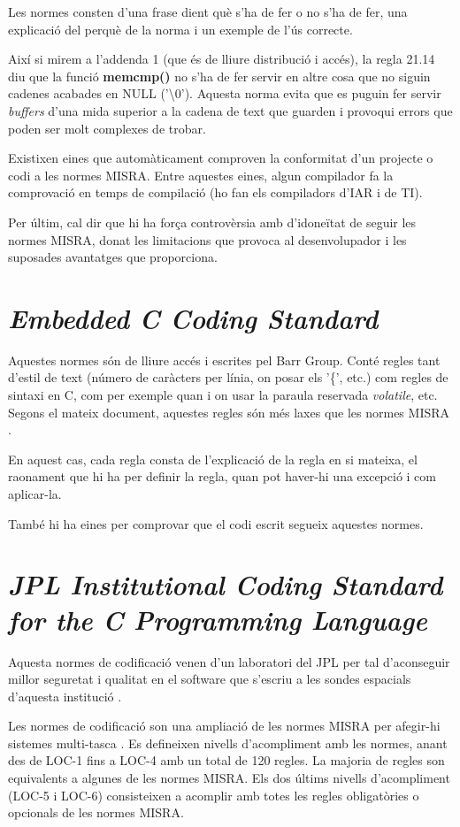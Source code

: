 Les normes consten d'una frase dient què s'ha de fer o no s'ha de fer, una explicació del perquè de la norma i un exemple de l'ús correcte.

Així si mirem a l'addenda 1 \cite[4]{MISRAAmend} (que és de lliure distribució i accés), la regla 21.14 diu que la funció {\bf memcmp()} no s'ha de fer servir en altre cosa que no siguin cadenes acabades en NULL ('\textbackslash 0'). Aquesta norma evita que es puguin fer servir {\em buffers} d'una mida superior a la cadena de text que guarden i provoqui errors que poden ser molt complexes de trobar.

Existixen eines que automàticament comproven la conformitat d'un projecte o codi a les normes MISRA. Entre aquestes eines, algun compilador fa la comprovació en temps de compilació (ho fan els compiladors d'IAR i de TI).

Per últim, cal dir que hi ha força controvèrsia amb d'idoneïtat de seguir les normes MISRA, donat les limitacions que provoca al desenvolupador i les suposades avantatges que proporciona.

\section{\em Embedded C Coding Standard}
Aquestes normes són de lliure accés i escrites pel Barr Group. Conté regles tant d'estil de text (número de caràcters per línia, on posar els '\{', etc.) com regles de sintaxi en C, com per exemple quan i on usar la paraula reservada {\em volatile}, etc. Segons el mateix document, aquestes regles són més laxes que les normes MISRA \cite{BARRGuidelines}.

En aquest cas, cada regla consta de l'explicació de la regla en si mateixa, el raonament que hi ha per definir la regla, quan pot haver-hi una excepció i com aplicar-la.

També hi ha eines per comprovar que el codi escrit segueix aquestes normes.

\section{\em JPL Institutional Coding Standard for the C Programming Language}
Aquesta normes de codificació venen d'un laboratori del JPL per tal d'aconseguir millor seguretat i qualitat en el software que s'escriu a les sondes espacials d'aquesta institució \cite{JPLLARS}.

Les normes de codificació son una ampliació de les normes MISRA per afegir-hi sistemes multi-tasca \cite{JPLCProgramming}. Es defineixen nivells d'acompliment amb les normes, anant des de LOC-1 fins a LOC-4 amb un total de 120 regles. La majoria de regles son equivalents a algunes de les normes MISRA. Els dos últims nivells d'acompliment (LOC-5 i LOC-6) consisteixen a acomplir amb totes les regles obligatòries o opcionals de les normes MISRA.

